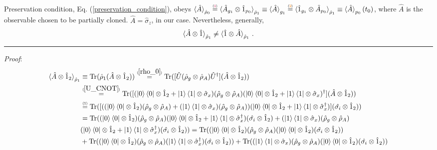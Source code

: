 \documentclass[11pt]{article}
\numberwithin{equation}{section} %
\numberwithin{figure}{section} %
\newcommand\numeq[1] %
  {\stackrel{\scriptscriptstyle(\mkern-1.5mu#1\mkern-1.5mu)}{=}}
\begin{document}
Preservation condition, Eq. (\ref{preservation_condition}), obeys $ 
\braket{\hat{A}}_{\hat{\rho}_0} \numeq{{\color{purple}1}} \braket{\hat{A}_{g_1}\otimes \hat{1}_{p_0}}_{\hat{\rho}_1}\equiv \braket{\hat{A}}_{g_1} \numeq{{\color{orange}2}} \braket{\hat{1}_{g_1}\otimes\hat{A}_{p_0}}_{\hat{\rho}_1}\equiv\braket{\hat{A}}_{p_0}(t_0)$, where $\hat{A}$ is the observable chosen to be partially cloned. $\hat{A}=\hat{\sigma}_z$, in our case. Nevertheless, generally,
\begin{equation}
\braket{\hat{A}\otimes \hat{1}}_{\hat{\rho}_1} \neq \braket{\hat{1}\otimes\hat{A}}_{\hat{\rho}_1}\,.
\end{equation}

\noindent
{\color{red} \rule{\linewidth}{0.5mm} }
\emph{Proof}:
\begin{equation} \label{Kronecker_trace}
\begin{split}
\braket{\hat{A}\otimes\hat{1}_2}_{\hat{\rho}_1}
&\equiv\textrm{Tr}(\hat{\rho}_1(\hat{A}\otimes\hat{1}_2))\numeq{\ref{rho_0}}\textrm{Tr}([\hat{U}(\hat{\rho}_g\otimes\hat{\rho}_A)\hat{U}^\dagger](\hat{A}\otimes\hat{1}_2))\\
&\numeq{\ref{U_CNOT}}\textrm{Tr}([(\ket{0}\bra{0}\otimes\hat{1}_2+\ket{1}\bra{1}\otimes\hat{\sigma}_x)(\hat{\rho}_g\otimes\hat{\rho}_A)(\ket{0}\bra{0}\otimes\hat{1}_2+\ket{1}\bra{1}\otimes\hat{\sigma}_x)^\dagger](\hat{A}\otimes\hat{1}_2))\\
&\numeq{1}\textrm{Tr}([((\ket{0}\bra{0}\otimes\hat{1}_2)(\hat{\rho}_g\otimes\hat{\rho}_A)+(\ket{1}\bra{1}\otimes\hat{\sigma}_x)(\hat{\rho}_g\otimes\hat{\rho}_A))(\ket{0}\bra{0}\otimes\hat{1}_2+\ket{1}\bra{1}\otimes\hat{\sigma}_x^\dagger)](\hat{\sigma_i}\otimes\hat{1}_2))\\
&=\textrm{Tr}((\ket{0}\bra{0}\otimes\hat{1}_2)(\hat{\rho}_g\otimes\hat{\rho}_A)(\ket{0}\bra{0}\otimes\hat{1}_2+\ket{1}\bra{1}\otimes\hat{\sigma}_x^\dagger)(\hat{\sigma_i}\otimes\hat{1}_2)+(\ket{1}\bra{1}\otimes\hat{\sigma}_x)(\hat{\rho}_g\otimes\hat{\rho}_A)\\
&(\ket{0}\bra{0}\otimes\hat{1}_2+\ket{1}\bra{1}\otimes\hat{\sigma}_x^\dagger)(\hat{\sigma_i}\otimes\hat{1}_2))=\textrm{Tr}((\ket{0}\bra{0}\otimes\hat{1}_2)(\hat{\rho}_g\otimes\hat{\rho}_A)(\ket{0}\bra{0}\otimes\hat{1}_2)(\hat{\sigma_i}\otimes\hat{1}_2))\\
&+\textrm{Tr}((\ket{0}\bra{0}\otimes\hat{1}_2)(\hat{\rho}_g\otimes\hat{\rho}_A)(\ket{1}\bra{1}\otimes\hat{\sigma}_x^\dagger)(\hat{\sigma_i}\otimes\hat{1}_2))+\textrm{Tr}((\ket{1}\bra{1}\otimes\hat{\sigma}_x)(\hat{\rho}_g\otimes\hat{\rho}_A)(\ket{0}\bra{0}\otimes\hat{1}_2)(\hat{\sigma_i}\otimes\hat{1}_2))\\

\end{split}
\end{equation}
\end{document}
